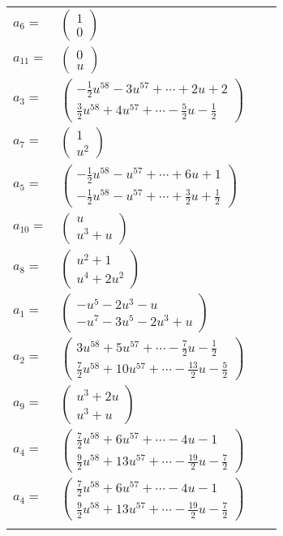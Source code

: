 \documentclass[1p]{elsarticle_modified}
\theoremstyle{definition}
\begin{document}
\begin{tabular}{m{7pt} m{180pt} m{7pt} m{180pt} }
\flushright $a_{6}=$&$\begin{pmatrix}1\\0\end{pmatrix}$ \\
\flushright $a_{11}=$&$\begin{pmatrix}0\\u\end{pmatrix}$ \\
\flushright $a_{3}=$&$\begin{pmatrix}-\frac{1}{2} u^{58}-3 u^{57}+\cdots+2 u+2\\\frac{3}{2} u^{58}+4 u^{57}+\cdots-\frac{5}{2} u-\frac{1}{2}\end{pmatrix}$ \\
\flushright $a_{7}=$&$\begin{pmatrix}1\\u^2\end{pmatrix}$ \\
\flushright $a_{5}=$&$\begin{pmatrix}-\frac{1}{2} u^{58}- u^{57}+\cdots+6 u+1\\-\frac{1}{2} u^{58}- u^{57}+\cdots+\frac{3}{2} u+\frac{1}{2}\end{pmatrix}$ \\
\flushright $a_{10}=$&$\begin{pmatrix}u\\u^3+u\end{pmatrix}$ \\
\flushright $a_{8}=$&$\begin{pmatrix}u^2+1\\u^4+2 u^2\end{pmatrix}$ \\
\flushright $a_{1}=$&$\begin{pmatrix}- u^5-2 u^3- u\\- u^7-3 u^5-2 u^3+u\end{pmatrix}$ \\
\flushright $a_{2}=$&$\begin{pmatrix}3 u^{58}+5 u^{57}+\cdots-\frac{7}{2} u-\frac{1}{2}\\\frac{7}{2} u^{58}+10 u^{57}+\cdots-\frac{13}{2} u-\frac{5}{2}\end{pmatrix}$ \\
\flushright $a_{9}=$&$\begin{pmatrix}u^3+2 u\\u^3+u\end{pmatrix}$ \\
\flushright $a_{4}=$&$\begin{pmatrix}\frac{7}{2} u^{58}+6 u^{57}+\cdots-4 u-1\\\frac{9}{2} u^{58}+13 u^{57}+\cdots-\frac{19}{2} u-\frac{7}{2}\end{pmatrix}$\\ \flushright $a_{4}=$&$\begin{pmatrix}\frac{7}{2} u^{58}+6 u^{57}+\cdots-4 u-1\\\frac{9}{2} u^{58}+13 u^{57}+\cdots-\frac{19}{2} u-\frac{7}{2}\end{pmatrix}$\\&\end{tabular}
\end{document}
